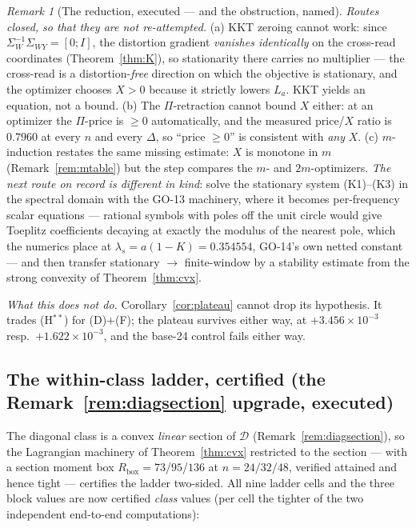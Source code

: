 \documentclass[11pt]{article}
\theoremstyle{definition}
\theoremstyle{remark}
\newtheorem{remark}{Remark}
\begin{document}
\begin{remark}[The reduction, executed --- and the obstruction, named]
\emph{Routes closed, so that they are not re-attempted.} (a) KKT
zeroing cannot work: since $\Sigma_W^{-1}\Sigma_{WY}=[0;I]$, the
distortion gradient \emph{vanishes identically} on the cross-read
coordinates (Theorem~\ref{thm:K}), so stationarity there carries no
multiplier --- the cross-read is a distortion-\emph{free} direction on
which the objective is stationary, and the optimizer chooses $X>0$
because it strictly lowers $L_a$. KKT yields an equation, not a bound.
(b) The $\Pi$-retraction cannot bound $X$ either: at an optimizer the
$\Pi$-price is $\ge0$ automatically, and the measured price/$X$ ratio
is $0.7960$ at every $n$ and every $\Delta$, so ``price $\ge0$'' is
consistent with \emph{any} $X$. (c) $m$-induction restates the same
missing estimate: $X$ is monotone in $m$
(Remark~\ref{rem:mtable}) but the step compares the $m$- and
$2m$-optimizers. \emph{The next route on record is different in kind}:
solve the stationary system (K1)--(K3) in the spectral domain with the
GO-13 machinery, where it becomes per-frequency scalar equations ---
rational symbols with poles off the unit circle would give Toeplitz
coefficients decaying at exactly the modulus of the nearest pole, which
the numerics place at $\lambda_s=a(1-K)=0.354554$, GO-14's own netted
constant --- and then transfer stationary $\to$ finite-window by a
stability estimate from the strong convexity of
Theorem~\ref{thm:cvx}.

\emph{What this does \emph{not} do.} Corollary~\ref{cor:plateau}
cannot drop its hypothesis. It trades (H$^{\ast\ast}$) for (D)$+$(F);
the plateau survives either way, at $+3.456\times10^{-3}$ resp.\
$+1.622\times10^{-3}$, and the base-24 control fails either way.
\end{remark}

\subsection{The within-class ladder, certified (the
Remark~\ref{rem:diagsection} upgrade, executed)}
\label{sec:ladder}
The diagonal class is a convex \emph{linear} section of $\mathcal D$
(Remark~\ref{rem:diagsection}), so the Lagrangian machinery of
Theorem~\ref{thm:cvx} restricted to the section --- with a section
moment box $R_{\mathrm{box}}=73$/$95$/$136$ at $n=24/32/48$, verified
attained and hence tight --- certifies the ladder two-sided. All nine
ladder cells and the three block values are now certified
\emph{class} values (per cell the tighter of the two independent
end-to-end computations):
\end{document}

